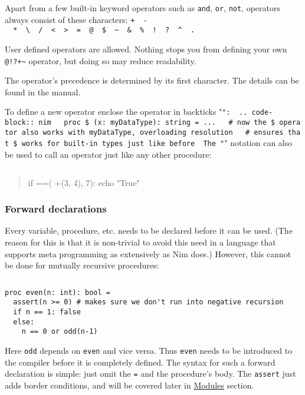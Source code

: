 Apart from a few built-in keyword operators such as \texttt{and},
\texttt{or}, \texttt{not}, operators always consist of these characters:
\texttt{+\ \ -\ \ *\ \ \textbackslash{}\ \ /\ \ \textless{}\ \ \textgreater{}\ \ =\ \ @\ \ \$\ \ \textasciitilde{}\ \ \&\ \ \%\ \ !\ \ ?\ \ \^{}\ \ .\ \ \textbar{}}

User defined operators are allowed. Nothing stops you from defining your
own \texttt{@!?+\textasciitilde{}} operator, but doing so may reduce
readability.

The operator's precedence is determined by its first character. The
details can be found in the manual.

To define a new operator enclose the operator in backticks
"\texttt{":\ \ ..\ code-block::\ nim\ \ \ proc\ \textasciigrave{}\$\textasciigrave{}\ (x:\ myDataType):\ string\ =\ ...\ \ \ \#\ now\ the\ \$\ operator\ also\ works\ with\ myDataType,\ overloading\ resolution\ \ \ \#\ ensures\ that\ \$\ works\ for\ built-in\ types\ just\ like\ before\ \ The\ "}"
notation can also be used to call an operator just like any other
procedure:

\begin{verbatim}
\end{verbatim}

\begin{quote}
if {==}( {+}(3, 4), 7): echo "True"
\end{quote}

\hypertarget{forward-declarations}{%
\subsubsection{Forward declarations}\label{forward-declarations}}

Every variable, procedure, etc. needs to be declared before it can be
used. (The reason for this is that it is non-trivial to avoid this need
in a language that supports meta programming as extensively as Nim
does.) However, this cannot be done for mutually recursive procedures:

\begin{verbatim}
\end{verbatim}

\begin{verbatim}
proc even(n: int): bool =
  assert(n >= 0) # makes sure we don't run into negative recursion
  if n == 1: false
  else:
    n == 0 or odd(n-1)
\end{verbatim}

Here \texttt{odd} depends on \texttt{even} and vice versa. Thus
\texttt{even} needs to be introduced to the compiler before it is
completely defined. The syntax for such a forward declaration is simple:
just omit the \texttt{=} and the procedure's body. The \texttt{assert}
just adds border conditions, and will be covered later in
\protect\hyperlink{modules}{Modules} section.

